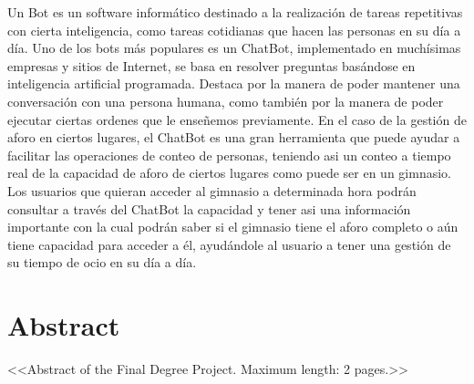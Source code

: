 Un Bot es un software informático destinado a la realización de tareas repetitivas con cierta inteligencia, como tareas cotidianas que hacen las personas en su día a día.
Uno de los bots más populares es un ChatBot, implementado en muchísimas empresas y sitios de Internet, se basa en resolver preguntas basándose en inteligencia artificial programada. Destaca por la manera de poder mantener una conversación con una persona humana, como también por la manera de poder ejecutar ciertas ordenes que le enseñemos previamente.
En el caso de la gestión de aforo en ciertos lugares, el ChatBot es una gran herramienta que puede ayudar a facilitar las operaciones de conteo de personas, teniendo asi un conteo a tiempo real de la capacidad de aforo de ciertos lugares como puede ser en un gimnasio. Los usuarios que quieran acceder al gimnasio a determinada hora podrán consultar a través del ChatBot la capacidad y tener asi una información importante con la cual podrán saber si el gimnasio tiene el aforo completo o aún tiene capacidad para acceder a él, ayudándole al usuario a tener una gestión de su tiempo de ocio en su día a día.

\newpage

\chapter*{Abstract}

<<Abstract of the Final Degree Project. Maximum length: 2 pages.>>


